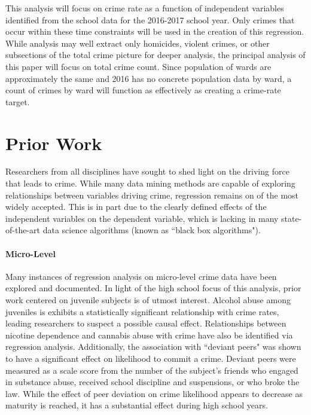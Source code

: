 \documentclass[12pt]{article}
\begin{document}
\par

This analysis will focus on crime rate as a function of independent variables identified from the school data for the 2016-2017 school year.  Only crimes that occur within these time constraints will be used in the creation of this regression.  While analysis may well extract only homicides, violent crimes, or other subsections of the total crime picture for deeper analysis, the principal analysis of this paper will focus on total crime count.  Since population of wards are approximately the same and 2016 has no concrete population data by ward, a count of crimes by ward will function as effectively as creating a crime-rate target.

	\section{Prior Work}

Researchers from all disciplines have sought to shed light on the driving force that leads to crime.  While many data mining methods are capable of exploring relationships between variables driving crime, regression remains on of the most widely accepted.\cite{kaur}  This is in part due to the clearly defined effects of the independent variables on the dependent variable, which is lacking in many state-of-the-art data science algorithms (known as ``black box algorithms").

\paragraph{Micro-Level}

Many instances of regression analysis on micro-level crime data have been explored and documented.  In light of the high school focus of this analysis, prior work centered on juvenile subjects is of utmost interest.  Alcohol abuse among juveniles is exhibits a statistically significant relationship with crime rates, leading researchers to suspect a possible causal effect.\cite{fergusson}  Relationships between nicotine dependence and cannabis abuse with crime have also be identified via regression analysis.\cite{ferg2}  Additionally, the association with ``deviant peers" was shown to have a significant effect on likelihood to commit a crime.  Deviant peers were measured as a scale score from the number of the subject's friends who engaged in substance abuse, received school discipline and suspensions, or who broke the law.  While the effect of peer deviation on crime likelihood appears to decrease as maturity is reached, it has a substantial effect during high school years.\cite{ferg2}
\end{document}

